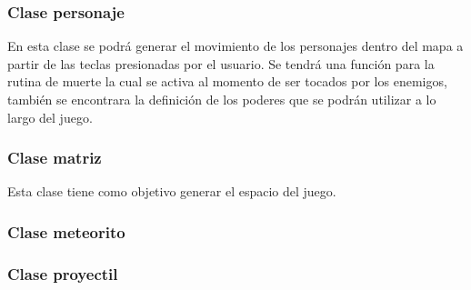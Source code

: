\documentclass{article}
\begin{document}
\subsubsection{Clase personaje}

En esta clase se podrá generar el movimiento de los personajes dentro del mapa a partir de las teclas presionadas por el usuario. Se tendrá una función para la rutina de muerte la cual se activa al momento de ser tocados por los enemigos, también se encontrara la definición de los poderes que se podrán utilizar a lo largo del juego. 
\subsubsection{Clase matriz}
Esta clase tiene como objetivo generar el espacio del juego.
\subsubsection{Clase meteorito}
\subsubsection{Clase proyectil}

\newpage



\cite{calistenia}
\end{document}
